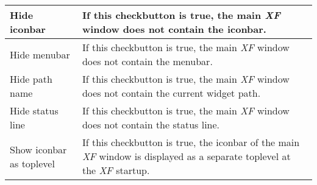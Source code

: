 {\begin{supertabular}{|l|p{5.5cm}|}
Hide iconbar                  & If this checkbutton is true,
                                the main {\em XF }
 window does not
                                contain the icon\-bar.\\  \hline
Hide menubar                  & If this checkbutton is true,
                                the main {\em XF }
 window does not
                                contain the menu\-bar.\\  \hline
Hide path name                & If this checkbutton is true,
                                the main {\em XF }
 window does not
                                contain the current widget
                                path.\\  \hline
Hide status line              & If this checkbutton is true,
                                the main {\em XF }
 window does not
                                contain the status line.\\  \hline
Show iconbar as toplevel      & If this checkbutton is true,
                                the icon\-bar of the
                                main {\em XF }
 window is displayed
                                as a separate toplevel at the
                                {\em XF }
 startup.\\ 
\end{supertabular}
}

{\newpage
\clearpage
\samepage \begin{figure}[hbt]
  \centerline{
  \epsfysize=5cm
  }
  
  \label{fig:The procedure XFProcHelpAbout}
\end{figure}
}

{\newpage
\clearpage
\samepage \begin{figure}[ht]
  \centerline{
  \epsfysize=10cm
  }
  
  \label{fig:CanvasLS}
\end{figure}
}

{\newpage
\clearpage
\samepage \begin{figure}[ht]
  \centerline{
  \epsfysize=1cm
  }
  
  \label{fig:EntryL}
\end{figure}
}

